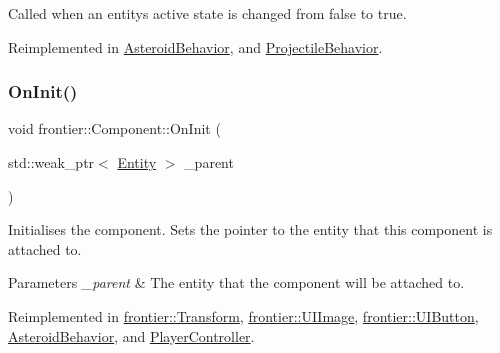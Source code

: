 Called when an entity\textquotesingle{}s active state is changed from false to true. 



Reimplemented in \hyperlink{class_asteroid_behavior_a7c4f344a9461d1296d4dcfcd51ed3bbc}{Asteroid\+Behavior}, and \hyperlink{class_projectile_behavior_aa01c813e541f6069d7ca9c69848ca0a6}{Projectile\+Behavior}.

\mbox{\label{classfrontier_1_1_component_af3da02905c4d79219d9b12f260a35ad1}} 
\subsubsection{\texorpdfstring{On\+Init()}{OnInit()}}
{\footnotesize\ttfamily void frontier\+::\+Component\+::\+On\+Init (\begin{DoxyParamCaption}\item[{std\+::weak\+\_\+ptr$<$ \hyperlink{classfrontier_1_1_entity}{Entity} $>$}]{\+\_\+parent }\end{DoxyParamCaption})\hspace{0.3cm}{\ttfamily [virtual]}}



Initialises the component. Sets the pointer to the entity that this component is attached to. 


\begin{DoxyParams}{Parameters}
{\em \+\_\+parent} & The entity that the component will be attached to. \\
\hline
\end{DoxyParams}


Reimplemented in \hyperlink{classfrontier_1_1_transform_a2d8181ec0003b04822124340fe7772c0}{frontier\+::\+Transform}, \hyperlink{classfrontier_1_1_u_i_image_ad862e7dd5bcd1c2847001f5e1b56c114}{frontier\+::\+U\+I\+Image}, \hyperlink{classfrontier_1_1_u_i_button_a1c4555865094fdd2dd9dd595740c05b0}{frontier\+::\+U\+I\+Button}, \hyperlink{class_asteroid_behavior_a79d9559f0d8e109e928acf7f8ff7acea}{Asteroid\+Behavior}, and \hyperlink{class_player_controller_a22c60d9e4464ee585f3592593f14bc50}{Player\+Controller}.

\mbox{\label{classfrontier_1_1_component_ab920f9bc07ce051ebb5559c5a66508d1}} 
